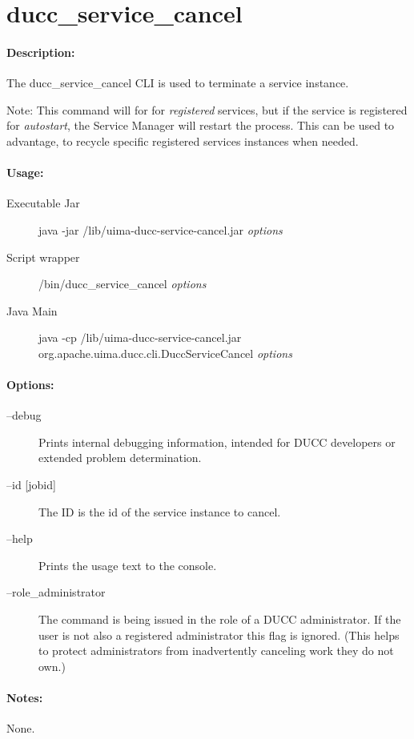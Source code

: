 \ifpdf
\else
{}
\fi
    \section{ducc\_service\_cancel}
    \label{sec:cli.service-cancel}
    \paragraph{Description:}

    The ducc\_service\_cancel CLI is used to terminate a service instance.

    Note: This command will for for {\em registered} services, but if the service is registered for
    {\em autostart}, the Service Manager will restart the process.  This can be used to advantage, to
    recycle specific registered services instances when needed.

    \paragraph{Usage:}
    \begin{description}
    \item[Executable Jar] java -jar \ducchome/lib/uima-ducc-service-cancel.jar {\em options}
    \item[Script wrapper] \ducchome/bin/ducc\_service\_cancel {\em options}
    \item[Java Main]      java -cp \ducchome/lib/uima-ducc-service-cancel.jar org.apache.uima.ducc.cli.DuccServiceCancel {\em options}
    \end{description}

    \paragraph{Options:}
    \begin{description}
        \item[--debug ]          
          Prints internal debugging information, intended for DUCC developers or extended problem determination.          
        \item[--id {[jobid]}]
          The ID is the id of the service instance to cancel.
        \item[--help]
          Prints the usage text to the console. 
        \item[--role\_administrator] The command is being issued in the role of a DUCC administrator.
          If the user is not also a registered administrator this flag is ignored.  (This helps to
          protect administrators from inadvertently canceling work they do not own.)
     \end{description}
        
    \paragraph{Notes:}
    None.

